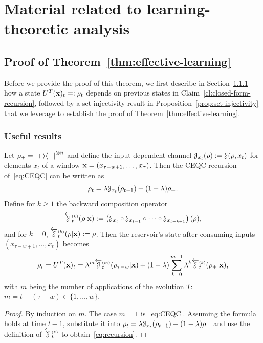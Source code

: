 \section{Material related to learning-theoretic analysis}
\subsection{Proof of Theorem~\ref{thm:effective-learning}}\label{subapp:proof-thm-effective-learning}
Before we provide the proof of this theorem, we first describe in Section~\ref{subsubsection:useful-results} how a state $U^T({\mathbf{x}})_t =: \rho_t$ depends on previous states in Claim~\ref{cl:closed-form-recursion}, followed by a set-injectivity result in Proposition~\ref{prop:set-injectivity} that we leverage to establish the proof of Theorem~\ref{thm:effective-learning}.


\subsubsection{Useful results}\label{subsubsection:useful-results}
\begin{claim}\label{cl:closed-form-recursion}
Let $\rho_+ = \ket{+}\!\bra{+}^{\otimes n}$ and define the input-dependent channel ${\mathcal{J}}_{x_t}(\rho) := {\mathcal{J}}(\rho, x_t)$ for elements $x_t$ of a window ${\mathbf{x}} = (x_{\tau-w+1}, \ldots, x_{\tau})$. Then the CEQC recursion of~\cref{eq:CEQC} can be written as
\begin{equation*}
    \rho_t = \lambda {\mathcal{J}}_{x_t}(\rho_{t-1}) + (1-\lambda) \rho_+.
\end{equation*}
Define for $k \geq 1$ the backward composition operator
\begin{equation*}
    \overleftarrow{{\mathcal{J}}}^{\scriptscriptstyle( k )}_{t}(\rho | {\mathbf{x}}) := \left({\mathcal{J}}_{x_t} \circ {\mathcal{J}}_{x_{t-1}} \circ \cdots \circ {\mathcal{J}}_{x_{t-k+1}}\right) (\rho),
\end{equation*}
and for $k = 0$, $\overleftarrow{{\mathcal{J}}}^{\scriptscriptstyle( k )}_{t}(\rho|{\mathbf{x}}) := \rho$. Then
the reservoir's state after consuming inputs $(x_{\tau - w + 1}, \dots, x_t)$ becomes
\begin{equation}\label{eq:recursion}
    \rho_t = U^T({\mathbf{x}})_t = \lambda^m \overleftarrow{{\mathcal{J}}}^{\scriptscriptstyle( m )}_{t}(\rho_{\tau-w} | {\mathbf{x}}) + (1-\lambda) \sum_{k=0}^{m-1} \lambda^k \overleftarrow{{\mathcal{J}}}^{\scriptscriptstyle( k )}_{t}(\rho_+ | {\mathbf{x}}),
\end{equation}
with $m$ being the number of applications of the evolution $T$: $m = t - (\tau - w) \in \{1, \ldots, w\}$.
\end{claim}
\begin{proof}
    By induction on $m$. The case $m=1$ is~\cref{eq:CEQC}. Assuming the formula holds at time $t-1$, substitute it into $\rho_t = \lambda {\mathcal{J}}_{x_t}(\rho_{t-1}) + (1-\lambda) \rho_+$ and use the definition of $\overleftarrow{{\mathcal{J}}}^{\scriptscriptstyle( k )}_{t}$ to obtain~\cref{eq:recursion}.
\end{proof}

